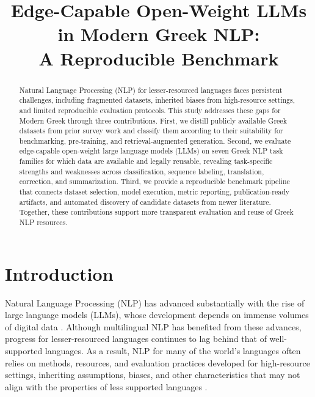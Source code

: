 \documentclass[sigconf,review,anonymous]{acmart}
\title{\texorpdfstring{Edge-Capable Open-Weight LLMs in Modern Greek NLP: \\A Reproducible Benchmark}{Edge-Capable Open-Weight LLMs in Modern Greek NLP: A Reproducible Benchmark}}
\begin{document}
\begin{abstract}
Natural Language Processing (NLP) for lesser-resourced languages faces persistent challenges, including fragmented datasets, inherited biases from high-resource settings, and limited reproducible evaluation protocols. This study addresses these gaps for Modern Greek through three contributions. First, we distill publicly available Greek datasets from prior survey work and classify them according to their suitability for benchmarking, pre-training, and retrieval-augmented generation. Second, we evaluate edge-capable open-weight large language models (LLMs) on seven Greek NLP task families for which data are available and legally reusable, revealing task-specific strengths and weaknesses across classification, sequence labeling, translation, correction, and summarization. Third, we provide a reproducible benchmark pipeline that connects dataset selection, model execution, metric reporting, publication-ready artifacts, and automated discovery of candidate datasets from newer literature. Together, these contributions support more transparent evaluation and reuse of Greek NLP resources.
\end{abstract}

\maketitle

\section{Introduction}
Natural Language Processing (NLP) has advanced substantially with the rise of large language models (LLMs), whose development depends on immense volumes of digital data \cite{brown2020language}. Although multilingual NLP has benefited from these advances, progress for lesser-resourced languages continues to lag behind that of well-supported languages. As a result, NLP for many of the world's languages often relies on methods, resources, and evaluation practices developed for high-resource settings, inheriting assumptions, biases, and other characteristics that may not align with the properties of less supported languages \cite{bakagianni2025systematic}.
\end{document}
